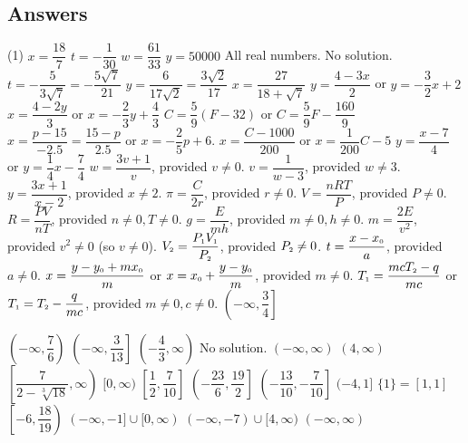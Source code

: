 \newpage

\subsection{Answers}

\begin{tasks}(1)
\task $x = \dfrac{18}{7}$
\task $t = -\dfrac{1}{30}$
\task $w = \dfrac{61}{33}$
\task  $y = 50000$
\task  All real numbers.
\task  No solution.
\task  $t = -\dfrac{5}{3\sqrt{7}} = -\dfrac{5\sqrt{7}}{21}$
\task  $y = \dfrac{6}{17\sqrt{2}}  = \dfrac{3 \sqrt{2}}{17}$
\task  $x = \dfrac{27}{18+\sqrt{7}}$
\task  $y = \dfrac{4 - 3x}{2}$ or $y = -\dfrac{3}{2}x + 2$
\task  $x = \dfrac{4 - 2y}{3}$ or $x = -\dfrac{2}{3} y + \dfrac{4}{3}$
\task  $C = \dfrac{5}{9}(F - 32)$ or  $C = \dfrac{5}{9} F - \dfrac{160}{9}$
\task  $x = \dfrac{p - 15}{-2.5} = \dfrac{15-p}{2.5}$ or $x = -\dfrac{2}{5} p + 6$.
\task  $x = \dfrac{C - 1000}{200}$ or $x = \dfrac{1}{200} C - 5$
\task  $y = \dfrac{x-7}{4}$ or $y = \dfrac{1}{4} x - \dfrac{7}{4}$
\task  $w = \dfrac{3v+1}{v}$, provided $v \neq 0$.
\task  $v = \dfrac{1}{w-3}$, provided $w \neq 3$.
\task $y = \dfrac{3x+1}{x-2}$, provided $x \neq 2$.
\task $\pi = \dfrac{C}{2r}$, provided $r \neq 0$.
\task $V = \dfrac{nRT}{P}$, provided $P \neq 0$.
\task $R = \dfrac{PV}{nT}$, provided $n \neq 0, T \neq 0$.
\task $g = \dfrac{E}{mh}$, provided $m \neq 0, h \neq 0$.
\task $m = \dfrac{2E}{v^2}$, provided $v^2 \neq 0$ (so $v \neq 0$).
\task $V_{\text{\tiny $2$}} = \dfrac{P_{\text{\tiny $1$}}V_{\text{\tiny $1$}}}{P_{\text{\tiny $2$}}}$, provided $P_{\text{\tiny $2$}} \neq 0$. 
\task $t = \dfrac{x - x_{\text{\tiny $0$}}}{a}$, provided $a \neq 0$.
\task $x = \dfrac{y-y_{\text{\tiny $0$}} + mx_{\text{\tiny $0$}}}{m}$ or $x = x_{\text{\tiny $0$}} + \dfrac{y-y_{\text{\tiny $0$}}}{m}$, provided $m \neq 0$. 
\task $T_{\text{\tiny $1$}} = \dfrac{mcT_{\text{\tiny $2$}} - q}{mc}$ or $T_{\text{\tiny $1$}} = T_{\text{\tiny $2$}} - \dfrac{q}{mc} $, provided $m \neq 0, c \neq 0$.  
\task $\left(-\infty, \dfrac{3}{4}\right]$
\addtocounter{task}{1}
\task $\left(-\infty, \dfrac{7}{6} \right)$  
\task  $\left( -\infty,  \dfrac{3}{13}\right]$
\task $\left(-\dfrac{4}{3}, \infty\right)$
\task No solution.
\task $(-\infty, \infty)$
\task $(4, \infty)$\vphantom{$\left[ \dfrac{7}{2 - \sqrt[3]{18}}, \infty\right)$
}
\task  $\left[ \dfrac{7}{2 - \sqrt[3]{18}}, \infty\right)$
\task   $[0, \infty)$\vphantom{$\left[ \dfrac{7}{2 - \sqrt[3]{18}}, \infty\right)$
}
\task $\left[ \dfrac{1}{2}, \dfrac{7}{10}\right]$
\task $\left(-\dfrac{23}{6}, \dfrac{19}{2} \right]$
\task $\left(-\dfrac{13}{10}, -\dfrac{7}{10} \right]$
\task  $(-4,1]$\vphantom{$\left[-6, \dfrac{18}{19} \right)$}
\task  $\{1 \} = [1,1]$ \vphantom{$\left[-6, \dfrac{18}{19} \right)$}
\task  $\left[-6, \dfrac{18}{19} \right)$
\task  $(-\infty, -1] \cup [0, \infty)$ 
\task   $(-\infty, -7) \cup [4, \infty)$
\task   $(-\infty, \infty)$
\end{tasks}
